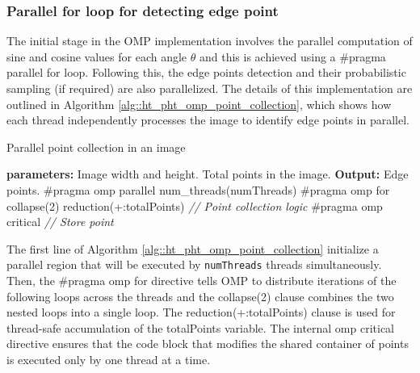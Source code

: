 \documentclass[conference]{IEEEtran}
\begin{document}
        \subsubsection{Parallel for loop for detecting edge point}
        \label{sec::plde}
    
            The initial stage in the OMP implementation involves the parallel computation of sine and cosine values for each angle $\theta$ and this is achieved using a \#pragma parallel for loop. Following this, the edge points detection and their probabilistic sampling (if required) are also parallelized. The details of this implementation are outlined in Algorithm \ref{alg::ht_pht_omp_point_collection}, which shows how each thread independently processes the image to identify edge points in parallel.
            
            \begin{algorithm}
            \caption{Parallel point collection in an image}
            \label{alg::ht_pht_omp_point_collection}
            \begin{algorithmic}[1]        
            \State \textbf{parameters:}
            \State \hspace{\algorithmicindent} Image width and height.
            \State \hspace{\algorithmicindent} Total points in the image.
            \State \textbf{Output:} Edge points.
                \State \#pragma omp parallel num\_threads(numThreads)
                \State \#pragma omp for collapse(2) reduction(+:totalPoints)
                        \State \textit{// Point collection logic}
                        \State \#pragma omp critical
                        \State \textit{// Store point}
                    \EndFor
                \EndFor
            \EndProcedure
            \end{algorithmic}
            \end{algorithm}
            
            The first line of Algorithm \ref{alg::ht_pht_omp_point_collection} initialize a parallel region that will be executed by \texttt{numThreads} threads simultaneously. Then, the \#pragma omp for directive tells OMP to distribute iterations of the following loops across the threads and the collapse(2) clause combines the two nested loops into a single loop. The reduction(+:totalPoints) clause is used for thread-safe accumulation of the totalPoints variable. The internal omp critical directive ensures that the code block that modifies the shared container of points is executed only by one thread at a time.
            
\end{document}
